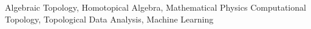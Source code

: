 
        {Algebraic Topology, Homotopical Algebra, Mathematical Physics}
		{Computational Topology, Topological Data Analysis, Machine Learning}